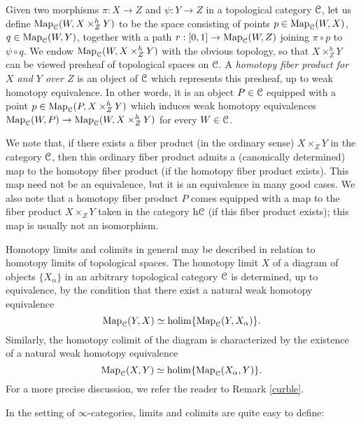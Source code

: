 \begin{1.2.13 Limits and colimits}
\begin{example}\label{exampull}
Given two morphisms $\pi: X \rightarrow Z$ and $\psi: Y \rightarrow Z$
in a topological category $\operatorname{\mathcal{C}}$, let us define $\operatorname{{Map}}_{\operatorname{\mathcal{C}}}(W,
X \times^h_Z Y)$ to be the space consisting of points $p \in
\operatorname{{Map}}_{\operatorname{\mathcal{C}}}(W,X)$, $q \in \operatorname{{Map}}_{\operatorname{\mathcal{C}}}(W,Y)$, together with a path $r: [0,1]
\rightarrow \operatorname{{Map}}_{\operatorname{\mathcal{C}}}(W,Z)$ joining $\pi \circ p$ to $\psi \circ q$. We
endow $\operatorname{{Map}}_{\operatorname{\mathcal{C}}}(W, X \times^h_Z Y)$ with the obvious topology,
so that $X \times^h_Z Y$ can be viewed presheaf of topological spaces
on $\operatorname{\mathcal{C}}$. A {\it homotopy fiber product for $X$ and $Y$ over
$Z$} is an object of $\operatorname{\mathcal{C}}$ which represents this presheaf, up to
weak homotopy equivalence. In other words, it is an object $P \in \operatorname{\mathcal{C}}$
equipped with a point $p \in \operatorname{{Map}}_{\operatorname{\mathcal{C}}}(P, X \times^h_Z Y)$ which
induces weak homotopy equivalences $\operatorname{{Map}}_{\operatorname{\mathcal{C}}}(W,P) \rightarrow
\operatorname{{Map}}_{\operatorname{\mathcal{C}}}(W, X \times^h_Z Y)$ for every $W \in \operatorname{\mathcal{C}}$.

We note that, if there exists a fiber product (in the ordinary sense) $X \times_Z Y$ in the category
$\operatorname{\mathcal{C}}$, then this ordinary fiber product admits a (canonically determined) map to the homotopy fiber product (if the homotopy fiber product exists). This map need not be an equivalence, but it is an equivalence in many good cases. We also note that a homotopy fiber product $P$ comes equipped with a map
to the fiber product $X \times_Z Y$ taken in the category $\rm{h} \it{\operatorname{\mathcal{C}}}$ (if this fiber product exists); this map is usually not an isomorphism.
\end{example}

\begin{remark}
Homotopy limits and colimits in general may be described in
relation to homotopy limits of topological spaces. The homotopy
limit $X$ of a diagram of objects $\{X_{\alpha} \}$ in an
arbitrary topological category $\operatorname{\mathcal{C}}$ is determined, up to
equivalence, by the condition that there exist a natural weak homotopy
equivalence
$$\operatorname{{Map}}_{\operatorname{\mathcal{C}}}(Y,X) \simeq \operatorname{holim} \{ \operatorname{{Map}}_{\operatorname{\mathcal{C}}}(Y, X_{\alpha})
\}.$$ Similarly, the homotopy colimit of the diagram is characterized by
the existence of a natural weak homotopy equivalence
$$\operatorname{{Map}}_{\operatorname{\mathcal{C}}}(X,Y) \simeq \operatorname{holim} \{ \operatorname{{Map}}_{\operatorname{\mathcal{C}}}(X_{\alpha},Y)
\}.$$
For a more precise discussion, we refer the reader to Remark \ref{curble}.
\end{remark}

In the setting of $\infty$-categories, limits and colimits
are quite easy to define:


\end{1.2.13 Limits and colimits}
